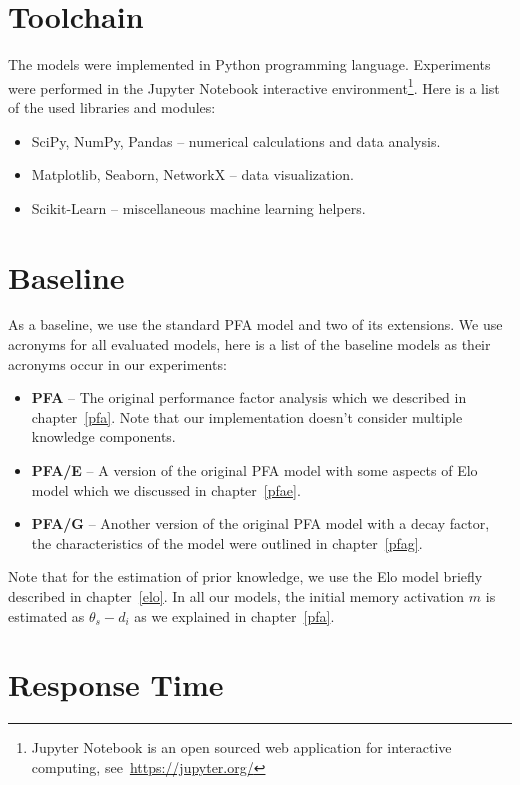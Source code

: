 \section{Toolchain}

The models were implemented in Python programming language. Experiments were performed in the Jupyter Notebook interactive environment\footnote{Jupyter Notebook is an open sourced web application for interactive computing, see~\url{https://jupyter.org/}}. Here is a list of the used libraries and modules:

\begin{itemize}
  \item SciPy, NumPy, Pandas -- numerical calculations and data analysis.
  \item Matplotlib, Seaborn, NetworkX -- data visualization.
  \item Scikit-Learn -- miscellaneous machine learning helpers.
\end{itemize}

\section{Baseline}

As a baseline, we use the standard PFA model and two of its extensions. We use acronyms for all evaluated models, here is a list of the baseline models as their acronyms occur in our experiments:

\begin{itemize}
  \item \textbf{PFA} -- The original performance factor analysis which we described in chapter~\ref{pfa}. Note that our implementation doesn't consider multiple knowledge components.
  \item \textbf{PFA/E} -- A version of the original PFA model with some aspects of Elo model which we discussed in chapter~\ref{pfae}.
  \item \textbf{PFA/G} -- Another version of the original PFA model with a decay factor, the characteristics of the model were outlined in chapter~\ref{pfag}.
\end{itemize}

Note that for the estimation of prior knowledge, we use the Elo model briefly described in chapter~\ref{elo}. In all our models, the initial memory activation $m$ is estimated as $\theta_s - d_i$ as we explained in chapter~\ref{pfa}.

\section{Response Time}

